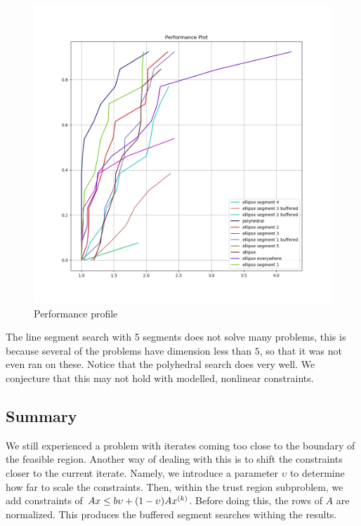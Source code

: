 \begin{figure}[ht]
    \centering
    \includegraphics[scale=0.4]{images/performance_profile_plot.png}
    \caption{Performance profile}
    \label{performance_profile}
\end{figure}



The line segment search with 5 segments does not solve many problems, this is because several of the problems have dimension less than $5$, so that it was not even ran on these.
Notice that the polyhedral search does very well.
We conjecture that this may not hold with modelled, nonlinear constraints.


\subsection{Summary}
We still experienced a problem with iterates coming too close to the boundary of the feasible region.
Another way of dealing with this is to shift the constraints closer to the current iterate.
Namely, we introduce a parameter $\upsilon$ to determine how far to scale the constraints.
Then, within the trust region subproblem, we add constraints of $Ax \le b\upsilon + (1-\upsilon) A x^{(k)} $.
Before doing this, the rows of $A$ are normalized.
This produces the buffered segment searches withing the results.

